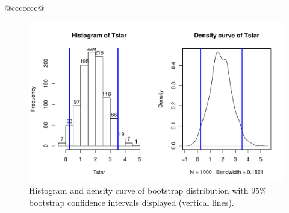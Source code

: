 \documentclass[]{book}
\newenvironment{Shaded}{\begin{snugshade}}{\end{snugshade}}
\newcommand{\KeywordTok}[1]{\textcolor[rgb]{0.13,0.29,0.53}{\textbf{#1}}}
\newcommand{\DataTypeTok}[1]{\textcolor[rgb]{0.13,0.29,0.53}{#1}}
\newcommand{\DecValTok}[1]{\textcolor[rgb]{0.00,0.00,0.81}{#1}}
\newcommand{\StringTok}[1]{\textcolor[rgb]{0.31,0.60,0.02}{#1}}
\newcommand{\OperatorTok}[1]{\textcolor[rgb]{0.81,0.36,0.00}{\textbf{#1}}}
\newcommand{\NormalTok}[1]{#1}
\theoremstyle{definition}
\theoremstyle{definition}
\theoremstyle{remark}
\begin{document}
\begin{longtable}[]{@{}ccccccc@{}}
\begin{minipage}[b]{0.10\columnwidth}
\begin{Shaded}
\begin{Highlighting}[]
\begin{Shaded}
\begin{Highlighting}[]
\begin{figure}
\centering
\includegraphics{02-reintroductionToStatistics_files/figure-latex/Figure2-19-1.pdf}
\caption{\label{fig:Figure2-19}Histogram and density curve of bootstrap distribution with
95\% bootstrap confidence intervals displayed (vertical lines).}
\end{figure}

\begin{Shaded}
\end{Shaded}


\end{Highlighting}
\end{Shaded}
\end{Highlighting}
\end{Shaded}
\end{minipage}
\end{longtable}
\end{document}
